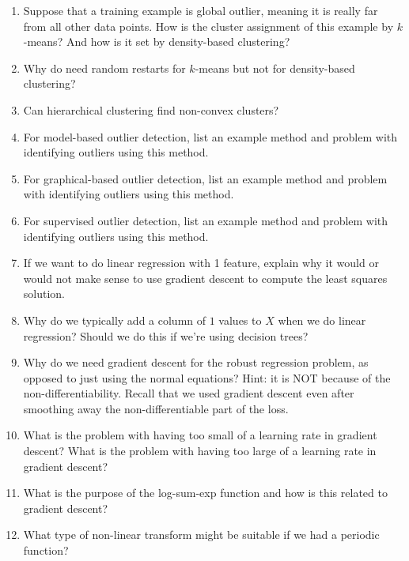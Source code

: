 \documentclass{article}
\begin{document}
\begin{enumerate}
\item Suppose that a training example is global outlier, meaning it is really far from all other data points. How is the cluster assignment of this example by $k$-means? And how is it set by density-based clustering?
%
\item Why do need random restarts for $k$-means but not for density-based clustering?
%
\item Can hierarchical clustering find non-convex clusters?
%
\item For model-based outlier detection, list an example method and problem with identifying outliers using this method.
%
\item For graphical-based outlier detection, list an example method and problem with identifying outliers using this method.
%
\item For supervised outlier detection, list an example method and problem with identifying outliers using this method.
%
\item If we want to do linear regression with 1 feature, explain why it would or would not make sense to use gradient descent to compute the least squares solution.
%
\item Why do we typically add a column of $1$ values to $X$ when we do linear regression? Should we do this if we're using decision trees?
%
\item Why do we need gradient descent for the robust regression problem, as opposed to just using the normal equations? Hint: it is NOT because of the non-differentiability. Recall that we used gradient descent even after smoothing away the non-differentiable part of the loss.
%
\item What is the problem with having too small of a learning rate in gradient descent? What is the problem with having too large of a learning rate in gradient descent?
%
\item What is the purpose of the log-sum-exp function and how is this related to gradient descent?
%
\item What type of non-linear transform might be suitable if we had a periodic function?
%
\end{enumerate}
\end{document}
